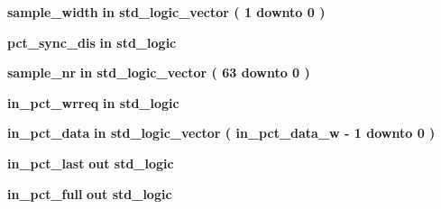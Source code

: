 \begin{DoxyCompactItemize}
\item 
{\bf sample\+\_\+width}  {\bfseries {\bfseries \textcolor{keywordflow}{in}\textcolor{vhdlchar}{ }}} {\bfseries \textcolor{comment}{std\+\_\+logic\+\_\+vector}\textcolor{vhdlchar}{ }\textcolor{vhdlchar}{(}\textcolor{vhdlchar}{ }\textcolor{vhdlchar}{ } \textcolor{vhdldigit}{1} \textcolor{vhdlchar}{ }\textcolor{keywordflow}{downto}\textcolor{vhdlchar}{ }\textcolor{vhdlchar}{ } \textcolor{vhdldigit}{0} \textcolor{vhdlchar}{ }\textcolor{vhdlchar}{)}\textcolor{vhdlchar}{ }} 
\item 
{\bf pct\+\_\+sync\+\_\+dis}  {\bfseries {\bfseries \textcolor{keywordflow}{in}\textcolor{vhdlchar}{ }}} {\bfseries \textcolor{comment}{std\+\_\+logic}\textcolor{vhdlchar}{ }} 
\item 
{\bf sample\+\_\+nr}  {\bfseries {\bfseries \textcolor{keywordflow}{in}\textcolor{vhdlchar}{ }}} {\bfseries \textcolor{comment}{std\+\_\+logic\+\_\+vector}\textcolor{vhdlchar}{ }\textcolor{vhdlchar}{(}\textcolor{vhdlchar}{ }\textcolor{vhdlchar}{ } \textcolor{vhdldigit}{63} \textcolor{vhdlchar}{ }\textcolor{keywordflow}{downto}\textcolor{vhdlchar}{ }\textcolor{vhdlchar}{ } \textcolor{vhdldigit}{0} \textcolor{vhdlchar}{ }\textcolor{vhdlchar}{)}\textcolor{vhdlchar}{ }} 
\item 
{\bf in\+\_\+pct\+\_\+wrreq}  {\bfseries {\bfseries \textcolor{keywordflow}{in}\textcolor{vhdlchar}{ }}} {\bfseries \textcolor{comment}{std\+\_\+logic}\textcolor{vhdlchar}{ }} 
\item 
{\bf in\+\_\+pct\+\_\+data}  {\bfseries {\bfseries \textcolor{keywordflow}{in}\textcolor{vhdlchar}{ }}} {\bfseries \textcolor{comment}{std\+\_\+logic\+\_\+vector}\textcolor{vhdlchar}{ }\textcolor{vhdlchar}{(}\textcolor{vhdlchar}{ }\textcolor{vhdlchar}{ }\textcolor{vhdlchar}{ }\textcolor{vhdlchar}{ }{\bfseries {\bf in\+\_\+pct\+\_\+data\+\_\+w}} \textcolor{vhdlchar}{-\/}\textcolor{vhdlchar}{ } \textcolor{vhdldigit}{1} \textcolor{vhdlchar}{ }\textcolor{keywordflow}{downto}\textcolor{vhdlchar}{ }\textcolor{vhdlchar}{ } \textcolor{vhdldigit}{0} \textcolor{vhdlchar}{ }\textcolor{vhdlchar}{)}\textcolor{vhdlchar}{ }} 
\item 
{\bf in\+\_\+pct\+\_\+last}  {\bfseries {\bfseries \textcolor{keywordflow}{out}\textcolor{vhdlchar}{ }}} {\bfseries \textcolor{comment}{std\+\_\+logic}\textcolor{vhdlchar}{ }} 
\item 
{\bf in\+\_\+pct\+\_\+full}  {\bfseries {\bfseries \textcolor{keywordflow}{out}\textcolor{vhdlchar}{ }}} {\bfseries \textcolor{comment}{std\+\_\+logic}\textcolor{vhdlchar}{ }} 

\end{DoxyCompactItemize}
